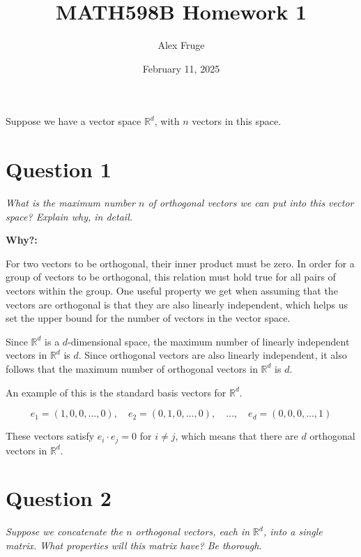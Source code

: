 \documentclass[hidelinks]{article}
\title{\textbf{MATH598B Homework 1}}
\author{Alex Fruge}
\date{February 11, 2025}
\begin{document}
	\hypersetup{bookmarksnumbered=true,}
	\pagecolor{black}
	\color{white}
	\maketitle

	
	\begin{Large}
			Suppose we have a vector space $\mathbb{R}^d$, with $n$ vectors in this space. 
	\end{Large}
	
	\section{Question 1}

	\textit{What is the maximum number $n$ of orthogonal vectors we can put into this vector space? Explain why, in detail.}\\
	
	{}
	
	\textbf{Why?:}
		
	For two vectors to be orthogonal, their inner product must be zero. In order for a group of vectors to be orthogonal, this relation must hold true for all pairs of vectors within the group. One useful property we get when assuming that the vectors are orthogonal is that they are also linearly independent, which helps us set the upper bound for the number of vectors in the vector space.
	
	Since $\mathbb{R}^d$ is a $d$-dimensional space, the maximum number of linearly independent vectors in $\mathbb{R}^d$ is $d$. Since orthogonal vectors are also linearly independent, it also follows that the maximum number of orthogonal vectors in $\mathbb{R}^d$ is $d$.
	
	An example of this is the standard basis vectors for $\mathbb{R}^d$. 
	
	\[e_1 = (1,0,0,\dots,0),\quad e_2 = (0,1,0,\dots,0),\quad\dots,\quad e_d = (0,0,0,\dots,1)\]
	
	These vectors satisfy $e_i \cdot e_j = 0$ for $i\ne j$, which means that there are $d$ orthogonal vectors in $\mathbb{R}^d$.
	
	\section{Question 2}
	
	\textit{Suppose we concatenate the $n$ orthogonal vectors, each in $\mathbb{R}^d$, into a single matrix. What properties will this matrix have? Be thorough.}
	
\end{document}

